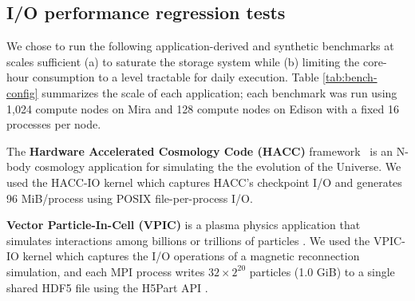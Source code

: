 \subsection{I/O performance regression tests} \label{sec:methods/tests}


We chose to run the following application-derived and synthetic benchmarks at scales sufficient (a) to saturate the storage system while (b) limiting the core-hour consumption to a level tractable for daily execution.
Table \ref{tab:bench-config} summarizes the scale of each application; each benchmark was run using 1,024 compute nodes on Mira and 128 compute nodes on Edison with a fixed 16 processes per node.

The \textbf{Hardware Accelerated Cosmology Code (HACC)} framework~\cite{habib2012} is an N-body cosmology application
for simulating the the evolution of the Universe.
We used the HACC-IO kernel which captures HACC's checkpoint I/O and generates 96 MiB/process using POSIX file-per-process I/O.

\textbf{Vector Particle-In-Cell (VPIC)} is a plasma physics application that simulates interactions among billions or trillions of particles \cite{Bowers2008}.
We used the VPIC-IO kernel which captures the I/O operations of a magnetic reconnection simulation, and each MPI process writes $32 \times 2^{20}$ particles (1.0 GiB)
to a single shared HDF5 file using the H5Part API \cite{H5Part}.

